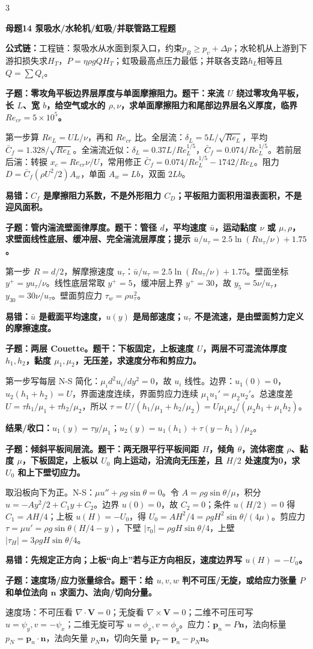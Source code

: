 \documentclass[a4paper]{article}
\newcommand{\mt}[1]{\vspace{0.22pt}\colorbox{M}{\parbox{\dimexpr\linewidth-2\fboxsep}{\color{white}\bfseries #1}}\par}
\newcommand{\qt}[1]{\vspace{0.10pt}\colorbox{Q}{\parbox{\dimexpr\linewidth-2\fboxsep}{\color{white}\bfseries #1}}\par}
\newcommand{\ans}[1]{\colorbox{G}{\parbox{\dimexpr\linewidth-2\fboxsep}{#1}}\par}
\newcommand{\warn}[1]{\colorbox{Y}{\parbox{\dimexpr\linewidth-2\fboxsep}{\color{E}\bfseries #1}}\par}
\newcommand{\res}[1]{{\color{E}\bfseries 结果/收口：}#1\par}
\newcommand{\form}[1]{{\color{M}\bfseries 公式链：}#1\par}
\begin{document}
\begin{multicols}{3}
\mt{母题14 泵吸水/水轮机/虹吸/并联管路工程题}
\form{工程链：泵吸水从水面到泵入口，约束$p_B\ge p_v+\Delta p$；水轮机从上游到下游扣损失求$H_T$，$P=\eta\rho gQH_T$；虹吸最高点压力最低；并联各支路$h_L$相等且$Q=\sum Q_i$。}
\qt{子题：零攻角平板边界层厚度与单面摩擦阻力。题干：来流 $U$ 绕过零攻角平板，长 $L$、宽 $b$，给空气或水的 $\rho,\nu$，求单面摩擦阻力和尾部边界层名义厚度，临界 $Re_{cr}=5\times10^5$。}
\ans{第一步算 $Re_L=UL/\nu$，再和 $Re_{cr}$ 比。全层流：$\delta_L=5L/\sqrt{Re_L}$，平均 $\bar C_f=1.328/\sqrt{Re_L}$。全湍流近似：$\delta_L=0.37L/Re_L^{1/5}$，$\bar C_f=0.074/Re_L^{1/5}$。若前层后湍：转捩 $x_c=Re_{cr}\nu/U$，常用修正 $\bar C_f=0.074/Re_L^{1/5}-1742/Re_L$。阻力 $D=\bar C_f(\rho U^2/2)A_w$，单面 $A_w=Lb$，双面 $2Lb$。}
\warn{易错：$C_f$ 是摩擦阻力系数，不是外形阻力 $C_D$；平板阻力面积用湿表面积，不是迎风面积。}
\qt{子题：管内湍流壁面律厚度。题干：管径 $d$，平均速度 $\bar u$，运动黏度 $\nu$ 或 $\mu,\rho$，求壁面线性底层、缓冲层、完全湍流层厚度；提示 $\bar u/u_\tau=2.5\ln(Ru_\tau/\nu)+1.75$。}
\ans{第一步 $R=d/2$，解摩擦速度 $u_\tau$：$\bar u/u_\tau=2.5\ln(Ru_\tau/\nu)+1.75$。壁面坐标 $y^+=yu_\tau/\nu$。线性底层常取 $y^+=5$，缓冲层上界 $y^+=30$，故 $y_5=5\nu/u_\tau$，$y_{30}=30\nu/u_\tau$。壁面剪应力 $\tau_w=\rho u_\tau^2$。}
\warn{易错：$\bar u$ 是截面平均速度，$u(y)$ 是局部速度；$u_\tau$ 不是流速，是由壁面剪力定义的摩擦速度。}
\qt{子题：两层 Couette。题干：下板固定，上板速度 $U$，两层不可混流体厚度 $h_1,h_2$，黏度 $\mu_1,\mu_2$，无压差，求速度分布和剪应力。}
\ans{第一步写每层 N-S 简化：$\mu_i d^2u_i/dy^2=0$，故 $u_i$ 线性。边界：$u_1(0)=0$，$u_2(h_1+h_2)=U$，界面速度连续，界面剪应力连续 $\mu_1u_1'=\mu_2u_2'$。总速度差 $U=\tau h_1/\mu_1+\tau h_2/\mu_2$，所以 $\tau=U/(h_1/\mu_1+h_2/\mu_2)=U\mu_1\mu_2/(\mu_2h_1+\mu_1h_2)$。}
\res{$u_1(y)=\tau y/\mu_1$；$u_2(y)=u_1(h_1)+\tau(y-h_1)/\mu_2$。}
\qt{子题：倾斜平板间层流。题干：两无限平行平板间距 $H$，倾角 $\theta$，流体密度 $\rho$、黏度 $\mu$，下板固定，上板以 $U_0$ 向上运动，沿流向无压差，且 $H/2$ 处速度为0，求 $U_0$ 和上下壁切应力。}
\ans{取沿板向下为正。N-S：$\mu u''+\rho g\sin\theta=0$。令 $A=\rho g\sin\theta/\mu$，积分 $u=-Ay^2/2+C_1y+C_2$。边界 $u(0)=0$，故 $C_2=0$；条件 $u(H/2)=0$ 得 $C_1=AH/4$；上板 $u(H)=-U_0$，得 $U_0=AH^2/4=\rho gH^2\sin\theta/(4\mu)$。剪应力 $\tau=\mu u'=\rho g\sin\theta(H/4-y)$，下壁 $|\tau_0|=\rho gH\sin\theta/4$，上壁 $|\tau_H|=3\rho gH\sin\theta/4$。}
\warn{易错：先规定正方向；上板“向上”若与正方向相反，速度边界写 $u(H)=-U_0$。}
\qt{子题：速度场/应力张量综合。题干：给 $u,v,w$ 判不可压/无旋，或给应力张量 $P$ 和单位法向 $\bm n$ 求面力、法向/切向分量。}
\ans{速度场：不可压看 $\nabla\cdot\bm V=0$；无旋看 $\nabla\times\bm V=0$；二维不可压可写 $u=\psi_y,v=-\psi_x$；二维无旋可写 $u=\phi_x,v=\phi_y$。应力：$\bm p_n=P\bm n$，法向标量 $p_N=\bm p_n\cdot\bm n$，法向矢量 $p_N\bm n$，切向矢量 $\bm p_T=\bm p_n-p_N\bm n$。}

\end{multicols}
\end{document}
